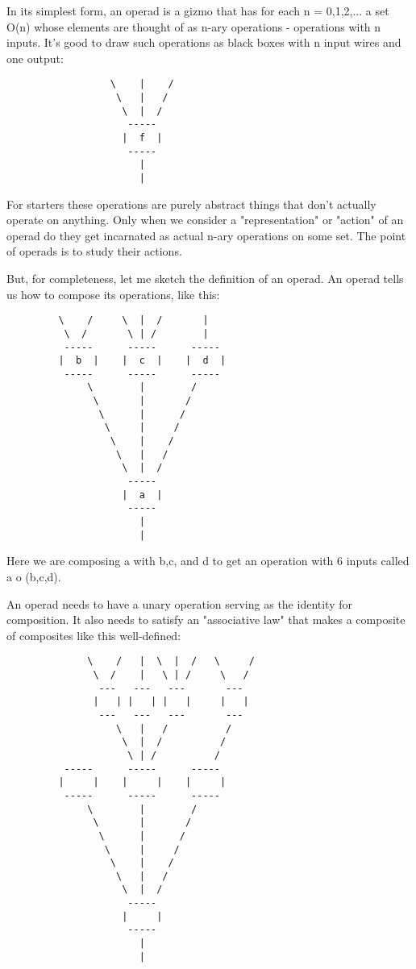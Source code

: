 In its simplest form, an operad is a gizmo that has for each 
n = 0,1,2,... a set O(n) whose elements are thought of as n-ary 
operations - operations with n inputs.  It's good to draw such 
operations as black boxes with n input wires and one output:  

\begin{verbatim}
                  \    |    /
                   \   |   / 
                    \  |  /
                     -----
                    |  f  | 
                     -----
                       |
                       |
\end{verbatim}
    
For starters these operations are purely abstract things that
don't actually operate on anything.  Only when we consider a
"representation" or "action" of an operad do they get incarnated
as actual n-ary operations on some set.   The point of operads is 
to study their actions. 

But, for completeness, let me sketch the definition of an operad.
An operad tells us how to compose its operations, like this:

\begin{verbatim}
         \    /     \  |  /       | 
          \  /       \ | /        |
          -----      -----      -----
         |  b  |    |  c  |    |  d  |
          -----      -----      -----
              \        |        /  
               \       |       /
                \      |      /
                 \     |     /
                  \    |    / 
                   \   |   /  
                    \  |  /
                     -----
                    |  a  | 
                     -----
                       |
                       |
\end{verbatim}
    
Here we are composing a with b,c, and d to get an operation with 6 
inputs called a o (b,c,d).

An operad needs to have a unary operation serving as the identity 
for composition.  It also needs to satisfy an "associative law" 
that makes a composite of composites like this well-defined:


\begin{verbatim}
              \    /   |  \  |  /   \     / 
               \  /    |   \ | /     \   / 
                ---   ---   ---       ---
               |   | |   | |   |     |   |
                ---   ---   ---       ---
                   \   |   /          /
                    \  |  /          / 
                     \ | /          / 
          -----      -----      -----
         |     |    |     |    |     |
          -----      -----      -----
              \        |        /  
               \       |       /   
                \      |      /
                 \     |     / 
                  \    |    / 
                   \   |   /   
                    \  |  /
                     -----
                    |     | 
                     -----
                       |
                       |
\end{verbatim}
    
